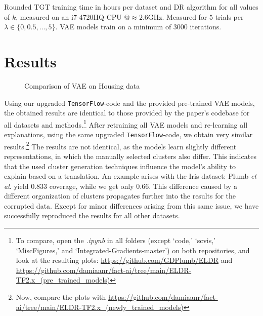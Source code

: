 \begin{table}[h]
  \centering
  
  \caption{Rounded TGT training time in hours per dataset and DR algorithm for all values of $k$, measured on an i7-4720HQ CPU @$\approx2.6$GHz. Measured for $5$ trials per $\lambda \in \{0, 0.5,  \ldots , 5\}$. VAE models train on a minimum of 3000 iterations.}
\end{table}

\section{Results}
\begin{figure}
  \caption{Comparison of VAE on Housing data}
\end{figure}

Using our upgraded \texttt{TensorFlow}-code and the provided pre-trained VAE models, the obtained results are identical to those provided by the paper's codebase for all datasets and methods.\footnote{To compare, open the \textit{.ipynb} in all folders (except `code,' `scvis,' `MiscFigures,' and `Integrated-Gradients-master') on both repositories, and look at the resulting plots: \url{https://github.com/GDPlumb/ELDR} and \url{https://github.com/damiaanr/fact-ai/tree/main/ELDR-TF2.x_(pre_trained_models)}} After retraining all VAE models and re-learning all explanations, using the same upgraded \texttt{TensorFlow}-code, we obtain very similar results.\footnote{Now, compare the plots with \url{https://github.com/damiaanr/fact-ai/tree/main/ELDR-TF2.x_(newly_trained_models)}} The results are not identical, as the models learn slightly different representations, in which the manually selected clusters also differ. This indicates that the used cluster generation techniques influence the model's ability to explain based on a translation. An example arises with the Iris dataset: Plumb \textit{et al}. yield $0.833$ coverage, while we get only $0.66$. This difference caused by a different organization of clusters propagates further into the results for the corrupted data. Except for minor differences arising from this same issue, we have successfully reproduced the results for all other datasets.\\

